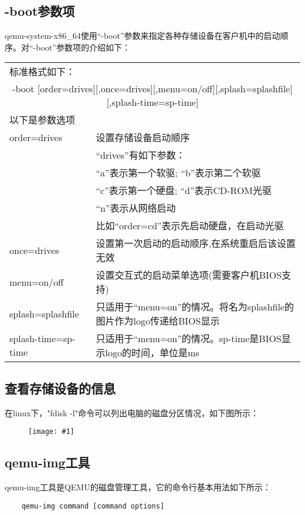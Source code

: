 \documentclass[a4paper,left=2.5cm,right=2.5cm,11pt]{article}
\newcommand{\fic}[1]{\begin{figure}[H]
		\center
		\texttt{[image: \#1]}
	\end{figure}}
\newcommand{\interval}{\vspace{0.5em}}
\begin{document}
\subsection{-boot参数项}
	qemu-system-x86\_64使用“-boot”参数来指定各种存储设备在客户机中的启动顺序。对“-boot”参数项的介绍如下：
	\interval
	\begin{longtable}{p{3cm}p{10cm}}
	\hline
	标准格式如下：& \\
	\multicolumn{2}{c}{-boot [order=drives][,once=drives][,menu=on/off][,splash=splashfile][,splash-time=sp-time]} \\
	\hline
	以下是参数选项 & \\
	\hline
	order=drives & 设置存储设备启动顺序 \\
			     & “drives”有如下参数：\\
			     & “a”表示第一个软驱; “b”表示第二个软驱 \\
				& “c”表示第一个硬盘; “d”表示CD-ROM光驱 \\
				& “n”表示从网络启动 \\
				& 比如“order=cd”表示先启动硬盘，在启动光驱 \\ 
	\hline
	once=drives & 设置第一次启动的启动顺序,在系统重启后该设置无效 \\
	\hline
	menu=on/off & 设置交互式的启动菜单选项(需要客户机BIOS支持) \\
	\hline
	splash=splashfile & 只适用于“menu=on”的情况。将名为splashfile的图片作为logo传递给BIOS显示 \\
	\hline
	splash-time=sp-time & 只适用于“menu=on”的情况。sp-time是BIOS显示logo的时间，单位是ms \\
	\hline
	\end{longtable}

\subsection{查看存储设备的信息}
	在linux下，"fdisk -l"命令可以列出电脑的磁盘分区情况，如下图所示：
	\fic{7.png}

\subsection{qemu-img工具}
	qemu-img工具是QEMU的磁盘管理工具，它的命令行基本用法如下所示：
	\begin{lstlisting}
	qemu-img command [command options]
	\end{lstlisting}
\end{document}
